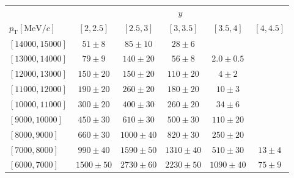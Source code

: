 \renewcommand{\arraystretch}{1.0}
\begin{tabular}{lr@{\hskip+0.2em}c@{\hskip+0.2em}r@{\hskip+0.2em}c@{\hskip+0.2em}rr@{\hskip+0.2em}c@{\hskip+0.2em}r@{\hskip+0.2em}c@{\hskip+0.2em}rr@{\hskip+0.2em}c@{\hskip+0.2em}r@{\hskip+0.2em}c@{\hskip+0.2em}rr@{\hskip+0.2em}c@{\hskip+0.2em}r@{\hskip+0.2em}c@{\hskip+0.2em}rr@{\hskip+0.2em}c@{\hskip+0.2em}r@{\hskip+0.2em}c@{\hskip+0.2em}r}
\toprule&\multicolumn{25}{c}{$y$}\\
$p_{\text{T}} [\text{MeV}/c]$ & \multicolumn{5}{c}{$[2,2.5]$} & \multicolumn{5}{c}{$[2.5,3]$} & \multicolumn{5}{c}{$[3,3.5]$} & \multicolumn{5}{c}{$[3.5,4]$} & \multicolumn{5}{c}{$[4,4.5]$} \\
\midrule$[14000,15000]$ & \multicolumn{5}{c}{$51 \pm 8$} & \multicolumn{5}{c}{$85 \pm 10$} & \multicolumn{5}{c}{$28 \pm 6$} & \multicolumn{5}{c}{ } & \multicolumn{5}{c}{ } \\
$[13000,14000]$ & \multicolumn{5}{c}{$79 \pm 9$} & \multicolumn{5}{c}{$140 \pm 20$} & \multicolumn{5}{c}{$56 \pm 8$} & \multicolumn{5}{c}{$2.0 \pm 0.5$} & \multicolumn{5}{c}{ } \\
$[12000,13000]$ & \multicolumn{5}{c}{$150 \pm 20$} & \multicolumn{5}{c}{$150 \pm 20$} & \multicolumn{5}{c}{$110 \pm 20$} & \multicolumn{5}{c}{$4 \pm 2$} & \multicolumn{5}{c}{ } \\
$[11000,12000]$ & \multicolumn{5}{c}{$190 \pm 20$} & \multicolumn{5}{c}{$260 \pm 20$} & \multicolumn{5}{c}{$180 \pm 20$} & \multicolumn{5}{c}{$10 \pm 3$} & \multicolumn{5}{c}{ } \\
$[10000,11000]$ & \multicolumn{5}{c}{$300 \pm 20$} & \multicolumn{5}{c}{$400 \pm 30$} & \multicolumn{5}{c}{$260 \pm 20$} & \multicolumn{5}{c}{$34 \pm 6$} & \multicolumn{5}{c}{ } \\
$[9000,10000]$ & \multicolumn{5}{c}{$450 \pm 30$} & \multicolumn{5}{c}{$610 \pm 30$} & \multicolumn{5}{c}{$500 \pm 30$} & \multicolumn{5}{c}{$110 \pm 20$} & \multicolumn{5}{c}{ } \\
$[8000,9000]$ & \multicolumn{5}{c}{$660 \pm 30$} & \multicolumn{5}{c}{$1000 \pm 40$} & \multicolumn{5}{c}{$820 \pm 30$} & \multicolumn{5}{c}{$250 \pm 20$} & \multicolumn{5}{c}{ } \\
$[7000,8000]$ & \multicolumn{5}{c}{$990 \pm 40$} & \multicolumn{5}{c}{$1590 \pm 50$} & \multicolumn{5}{c}{$1310 \pm 40$} & \multicolumn{5}{c}{$510 \pm 30$} & \multicolumn{5}{c}{$13 \pm 4$} \\
$[6000,7000]$ & \multicolumn{5}{c}{$1500 \pm 50$} & \multicolumn{5}{c}{$2730 \pm 60$} & \multicolumn{5}{c}{$2230 \pm 50$} & \multicolumn{5}{c}{$1090 \pm 40$} & \multicolumn{5}{c}{$75 \pm 9$} \\

\end{tabular}

